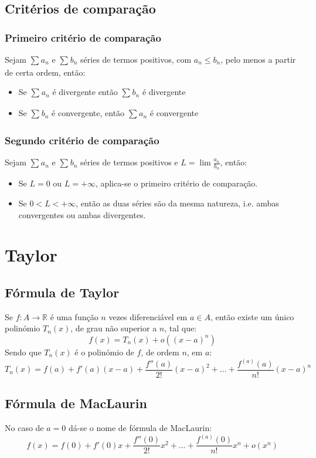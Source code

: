 \documentclass[10pt,a4paper]{report}
\begin{document}
\section{Critérios de comparação}
\subsection{Primeiro critério de comparação}
Sejam $\sum_{}^{} a_n$ e $\sum_{}^{} b_n$ séries de termos positivos, com $a_n \leq b_n$, pelo menos a partir de certa ordem, então:
\begin{itemize}
\item Se $\sum_{}^{} a_n$ é divergente então $\sum_{}^{} b_n$ é divergente
\item Se $\sum_{}^{} b_n$ é convergente, então $\sum_{}^{} a_n$ é convergente
\end{itemize}
\subsection{Segundo critério de comparação}
Sejam $\sum_{}^{} a_n$ e $\sum_{}^{} b_n$ séries de termos positivos e $L = \lim \frac{a_n}{b_n}$, então:
\begin{itemize}
\item Se $L = 0$ ou $L = +\infty$, aplica-se o primeiro critério de comparação.
\item Se $0 < L < +\infty$, então as duas séries são da mesma natureza, i.e. ambas convergentes ou ambas divergentes.
\end{itemize}

\chapter{Taylor}
\section{Fórmula de Taylor}
Se $f: A \rightarrow \mathbb{R}$ é uma função $n$ vezes diferenciável em $a \in A$, então existe um único polinómio $T_n(x)$, de grau não superior a $n$, tal que:
$$
f(x) = T_n(x) + o((x-a)^n)
$$
Sendo que $T_n(x)$ é o polinómio de $f$, de ordem $n$, em $a$:
$$
T_n(x) = f(a) + f'(a)(x-a) + \frac{f''(a)}{2!}(x-a)^2 + ... + \frac{f^{(a)}(a)}{n!}(x-a)^n
$$
\section{Fórmula de MacLaurin}
No caso de $a = 0$ dá-se o nome de fórmula de MacLaurin:
$$
f(x) = f(0) + f'(0)x + \frac{f''(0)}{2!}x^2 + ... + \frac{f^{(a)}(0)}{n!}x^n + o(x^n)
$$
\end{document}
